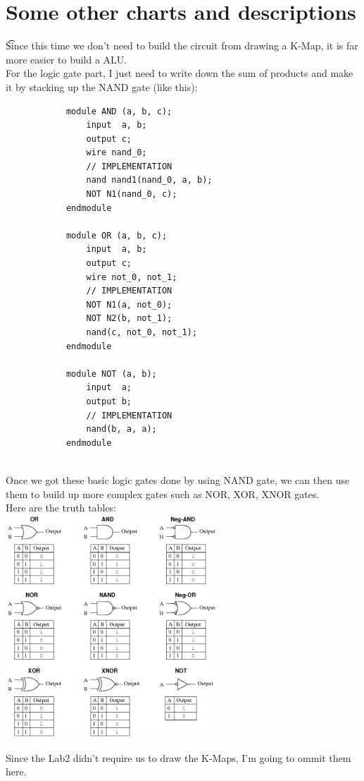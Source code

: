\documentclass{article}
\begin{document}
	\section{Some other charts and descriptions}
		\t Since this time we don't need to build the circuit from drawing a K-Map, it is far more easier to build a ALU.\\
		For the logic gate part, I just need to write down the sum of products and make it by stacking up the NAND gate (like this):
		\begin{verbatim}
			module AND (a, b, c);
				input  a, b;
				output c;
				wire nand_0;
				// IMPLEMENTATION
				nand nand1(nand_0, a, b);
				NOT N1(nand_0, c);
			endmodule

			module OR (a, b, c);
				input  a, b;
				output c;
				wire not_0, not_1;
				// IMPLEMENTATION
				NOT N1(a, not_0);
				NOT N2(b, not_1);
				nand(c, not_0, not_1);
			endmodule

			module NOT (a, b);
				input  a;
				output b;
				// IMPLEMENTATION
				nand(b, a, a);
			endmodule
	
		\end{verbatim}
		Once we got these basic logic gates done by using NAND gate, we can then use them to build up more complex gates such as NOR, XOR, XNOR gates.\\
		Here are the truth tables:\\
		\includegraphics[width=8cm]{truth-table1.png}

		Since the Lab2 didn't require us to draw the K-Maps, I'm going to ommit them here.
\end{document}
